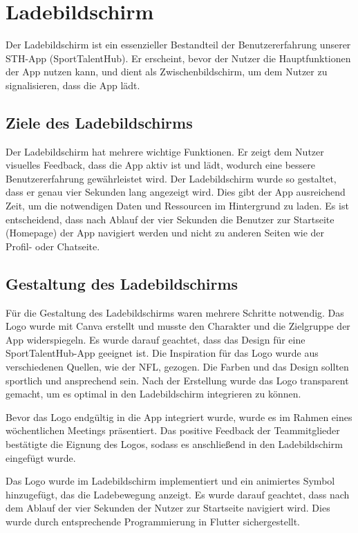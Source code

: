 \chapter{Ladebildschirm}

Der Ladebildschirm ist ein essenzieller Bestandteil der Benutzererfahrung unserer STH-App (SportTalentHub). Er erscheint, bevor der Nutzer die Hauptfunktionen der App nutzen kann, und dient als Zwischenbildschirm, um dem Nutzer zu signalisieren, dass die App lädt.

\section*{Ziele des Ladebildschirms}
Der Ladebildschirm hat mehrere wichtige Funktionen. Er zeigt dem Nutzer visuelles Feedback, dass die App aktiv ist und lädt, wodurch eine bessere Benutzererfahrung gewährleistet wird. Der Ladebildschirm wurde so gestaltet, dass er genau vier Sekunden lang angezeigt wird. Dies gibt der App ausreichend Zeit, um die notwendigen Daten und Ressourcen im Hintergrund zu laden. \newline
Es ist entscheidend, dass nach Ablauf der vier Sekunden die Benutzer zur Startseite (Homepage) der App navigiert werden und nicht zu anderen Seiten wie der Profil- oder Chatseite.

\section*{Gestaltung des Ladebildschirms}
Für die Gestaltung des Ladebildschirms waren mehrere Schritte notwendig. Das Logo wurde mit Canva erstellt und musste den Charakter und die Zielgruppe der App widerspiegeln. \newline
Es wurde darauf geachtet, dass das Design für eine SportTalentHub-App geeignet ist. Die Inspiration für das Logo wurde aus verschiedenen Quellen, wie der NFL, gezogen. Die Farben und das Design sollten sportlich und ansprechend sein. \newline
Nach der Erstellung wurde das Logo transparent gemacht, um es optimal in den Ladebildschirm integrieren zu können.

Bevor das Logo endgültig in die App integriert wurde, wurde es im Rahmen eines wöchentlichen Meetings präsentiert. Das positive Feedback der Teammitglieder bestätigte die Eignung des Logos, sodass es anschließend in den Ladebildschirm eingefügt wurde.

Das Logo wurde im Ladebildschirm implementiert und ein animiertes Symbol hinzugefügt, das die Ladebewegung anzeigt. \newline
Es wurde darauf geachtet, dass nach dem Ablauf der vier Sekunden der Nutzer zur Startseite navigiert wird. Dies wurde durch entsprechende Programmierung in Flutter sichergestellt.

